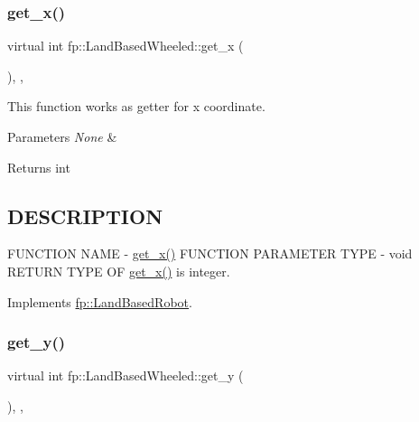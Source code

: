 \subsubsection{\texorpdfstring{get\+\_\+x()}{get\_x()}}
{\footnotesize\ttfamily virtual int fp\+::\+Land\+Based\+Wheeled\+::get\+\_\+x (\begin{DoxyParamCaption}{ }\end{DoxyParamCaption})\hspace{0.3cm}{\ttfamily [inline]}, {\ttfamily [override]}, {\ttfamily [virtual]}}



This function works as getter for x coordinate. 


\begin{DoxyParams}{Parameters}
{\em None} & \\
\hline
\end{DoxyParams}
\begin{DoxyReturn}{Returns}
int 
\end{DoxyReturn}
\hypertarget{_m_a_z_e_8h_DESCRIPTION}{}\subsection{D\+E\+S\+C\+R\+I\+P\+T\+I\+ON}\label{_m_a_z_e_8h_DESCRIPTION}
F\+U\+N\+C\+T\+I\+ON N\+A\+ME -\/ \hyperlink{classfp_1_1_land_based_wheeled_a75cb4df0270397db3a019f1abc694cf9}{get\+\_\+x()} F\+U\+N\+C\+T\+I\+ON P\+A\+R\+A\+M\+E\+T\+ER T\+Y\+PE -\/ void R\+E\+T\+U\+RN T\+Y\+PE OF \hyperlink{classfp_1_1_land_based_wheeled_a75cb4df0270397db3a019f1abc694cf9}{get\+\_\+x()} is integer. 

Implements \hyperlink{classfp_1_1_land_based_robot_a3624c5d041de0987c0103c6b01fa9bc6}{fp\+::\+Land\+Based\+Robot}.

\mbox{\label{classfp_1_1_land_based_wheeled_ae793757fd11ba270a6d9c335acb8cafd}} 
\subsubsection{\texorpdfstring{get\+\_\+y()}{get\_y()}}
{\footnotesize\ttfamily virtual int fp\+::\+Land\+Based\+Wheeled\+::get\+\_\+y (\begin{DoxyParamCaption}{ }\end{DoxyParamCaption})\hspace{0.3cm}{\ttfamily [inline]}, {\ttfamily [override]}, {\ttfamily [virtual]}}



